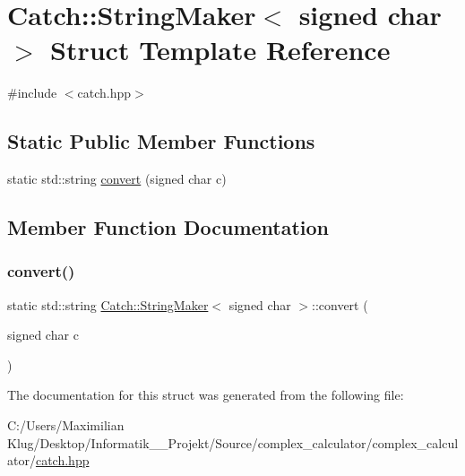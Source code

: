 \hypertarget{struct_catch_1_1_string_maker_3_01signed_01char_01_4}{}\section{Catch\+:\+:String\+Maker$<$ signed char $>$ Struct Template Reference}
\label{struct_catch_1_1_string_maker_3_01signed_01char_01_4}


{\ttfamily \#include $<$catch.\+hpp$>$}

\subsection*{Static Public Member Functions}
\begin{DoxyCompactItemize}
\item 
static std\+::string \mbox{\hyperlink{struct_catch_1_1_string_maker_3_01signed_01char_01_4_a5ec41f32916539dc90130539db8222cf}{convert}} (signed char c)
\end{DoxyCompactItemize}


\subsection{Member Function Documentation}
\mbox{\label{struct_catch_1_1_string_maker_3_01signed_01char_01_4_a5ec41f32916539dc90130539db8222cf}} 
\subsubsection{\texorpdfstring{convert()}{convert()}}
{\footnotesize\ttfamily static std\+::string \mbox{\hyperlink{struct_catch_1_1_string_maker}{Catch\+::\+String\+Maker}}$<$ signed char $>$\+::convert (\begin{DoxyParamCaption}\item[{signed char}]{c }\end{DoxyParamCaption})\hspace{0.3cm}{\ttfamily [static]}}



The documentation for this struct was generated from the following file\+:\begin{DoxyCompactItemize}
\item 
C\+:/\+Users/\+Maximilian Klug/\+Desktop/\+Informatik\+\_\+\_\+\+Projekt/\+Source/complex\+\_\+calculator/complex\+\_\+calculator/\mbox{\hyperlink{catch_8hpp}{catch.\+hpp}}\end{DoxyCompactItemize}
